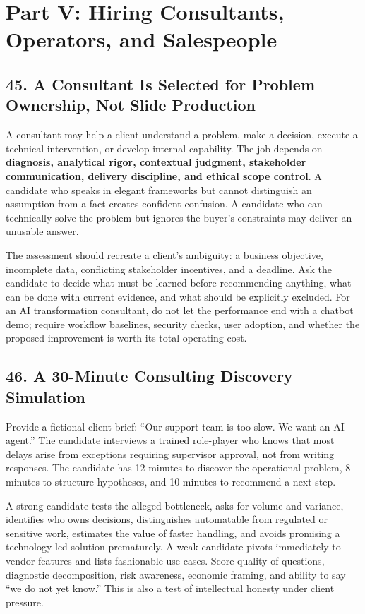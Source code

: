 \section*{Part V: Hiring Consultants, Operators, and Salespeople}

\subsection*{45. A Consultant Is Selected for Problem Ownership, Not Slide Production}

A consultant may help a client understand a problem, make a decision, execute a technical intervention, or develop internal capability. The job depends on \textbf{diagnosis, analytical rigor, contextual judgment, stakeholder communication, delivery discipline, and ethical scope control}. A candidate who speaks in elegant frameworks but cannot distinguish an assumption from a fact creates confident confusion. A candidate who can technically solve the problem but ignores the buyer's constraints may deliver an unusable answer.

The assessment should recreate a client's ambiguity: a business objective, incomplete data, conflicting stakeholder incentives, and a deadline. Ask the candidate to decide what must be learned before recommending anything, what can be done with current evidence, and what should be explicitly excluded. For an AI transformation consultant, do not let the performance end with a chatbot demo; require workflow baselines, security checks, user adoption, and whether the proposed improvement is worth its total operating cost.

\subsection*{46. A 30-Minute Consulting Discovery Simulation}

Provide a fictional client brief: ``Our support team is too slow. We want an AI agent.'' The candidate interviews a trained role-player who knows that most delays arise from exceptions requiring supervisor approval, not from writing responses. The candidate has 12 minutes to discover the operational problem, 8 minutes to structure hypotheses, and 10 minutes to recommend a next step.

A strong candidate tests the alleged bottleneck, asks for volume and variance, identifies who owns decisions, distinguishes automatable from regulated or sensitive work, estimates the value of faster handling, and avoids promising a technology-led solution prematurely. A weak candidate pivots immediately to vendor features and lists fashionable use cases. Score quality of questions, diagnostic decomposition, risk awareness, economic framing, and ability to say ``we do not yet know.'' This is also a test of intellectual honesty under client pressure.

